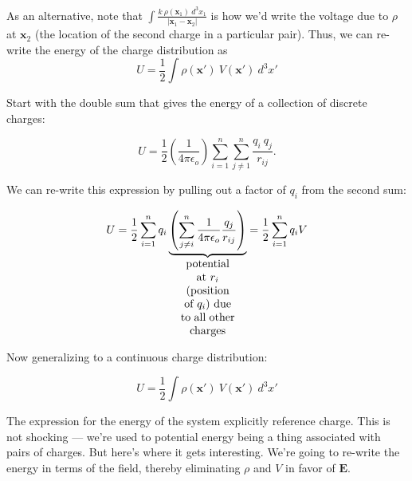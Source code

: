 \documentclass{article}
\begin{document}
\vspace{1em}

As an alternative, note that $\displaystyle \int \frac{k\ \rho(\bm{x}_1)\ d^3x_1}{\left| \bm{x}_1 - \bm{x}_2 \right|}$ is how we'd write the voltage due to $\rho$ at $\bm{x}_2$ (the location of the second charge in a particular pair). Thus, we can re-write the energy of the charge distribution as
\begin{equation}
    \boxed{U = \frac{1}{2} \int \rho(\bm{x'})\ V(\bm{x'})\ d^3x'} \tag{2} \label{eq:3:u}
\end{equation}

\begin{mdframed}[backgroundcolor=WHITE,align=left,userdefinedwidth=0.95\textwidth, topline=false, rightline=false,frametitle={Alternate derivation of (\ref{eq:3:u})}]

Start with the double sum that gives the energy of a collection of discrete charges:

\begin{equation*}
    U = \frac{1}{2} \left( \frac{1}{4\pi\epsilon_o} \right) \sum\limits_{i = 1}^{n} \sum\limits_{j \neq 1}^{n} \frac{q_i\ q_j}{r_{ij}}.
\end{equation*}

We can re-write this expression by pulling out a factor of $q_i$ from the second sum:

\begin{equation*}
    U = \frac{1}{2} \sum\limits_{i = 1}^{n} q_i \underbrace{\left( \sum\limits_{j \neq i}^{n} \frac{1}{4\pi\epsilon_o} \frac{q_j}{r_{ij}} \right)}_{\parbox[c]{0.14\textwidth}{\centering potential at $r_i$ (position of $q_i$) due to all other charges}} = \frac{1}{2} \sum\limits_{i = 1}^{n} q_i V
\end{equation*}

Now generalizing to a continuous charge distribution:

\begin{equation*}
    \boxed{U = \frac{1}{2} \int \rho (\bm{x'})\ V(\bm{x'})\ d^3x'}
\end{equation*}

\end{mdframed}

The expression for the energy of the system explicitly reference charge. This is not shocking --- we're used to potential energy being a thing associated with pairs of charges. But here's where it gets interesting. We're going to re-write the energy in terms of the field, thereby eliminating $\rho$ and $V$ in favor of $\bm{E}$.
\end{document}
